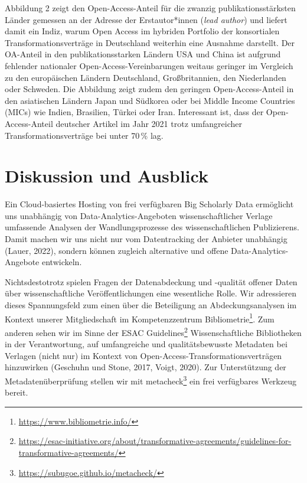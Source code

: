 \documentclass[a4paper,
fontsize=11pt,
oneside,
numbers=noperiodatend,
parskip=half-,
bibliography=totoc,
final
]{scrartcl}
\begin{document}
Abbildung 2 zeigt den Open-Access-Anteil für die zwanzig
publikationsstärksten Länder gemessen an der Adresse der Erstautor*innen
(\emph{lead author}) und liefert damit ein Indiz, warum Open Access im
hybriden Portfolio der konsortialen Transformationsverträge in
Deutschland weiterhin eine Ausnahme darstellt. Der OA-Anteil in den
publikationsstarken Ländern USA und China ist aufgrund fehlender
nationaler Open-Access-Vereinbarungen weitaus geringer im Vergleich zu
den europäischen Ländern Deutschland, Großbritannien, den Niederlanden
oder Schweden. Die Abbildung zeigt zudem den geringen Open-Access-Anteil
in den asiatischen Ländern Japan und Südkorea oder bei Middle Income
Countries (MICs) wie Indien, Brasilien, Türkei oder Iran. Interessant
ist, dass der Open-Access-Anteil deutscher Artikel im Jahr 2021 trotz
umfangreicher Transformationsverträge bei unter 70\,\% lag.

\hypertarget{diskussion-und-ausblick}{%
\section{Diskussion und Ausblick}\label{diskussion-und-ausblick}}

Ein Cloud-basiertes Hosting von frei verfügbaren Big Scholarly Data
ermöglicht uns unabhängig von Data-Analytics-Angeboten
wissenschaftlicher Verlage umfassende Analysen der Wandlungsprozesse des
wissenschaftlichen Publizierens. Damit machen wir uns nicht nur vom
Datentracking der Anbieter unabhängig (Lauer, 2022), sondern können
zugleich alternative und offene Data-Analytics-Angebote entwickeln.

Nichtsdestotrotz spielen Fragen der Datenabdeckung und -qualität offener
Daten über wissenschaftliche Veröffentlichungen eine wesentliche Rolle.
Wir adressieren dieses Spannungsfeld zum einen über die Beteiligung an
Abdeckungsanalysen im Kontext unserer Mitgliedschaft im Kompetenzzentrum
Bibliometrie\footnote{\url{https://www.bibliometrie.info/}}. Zum anderen
sehen wir im Sinne der ESAC Guidelines\footnote{\url{https://esac-initiative.org/about/transformative-agreements/guidelines-for-transformative-agreements/}}
Wissenschaftliche Bibliotheken in der Verantwortung, auf umfangreiche
und qualitätsbewusste Metadaten bei Verlagen (nicht nur) im Kontext von
Open-Access-Transformationsverträgen hinzuwirken (Geschuhn und Stone,
2017, Voigt, 2020). Zur Unterstützung der Metadatenüberprüfung stellen
wir mit metacheck\footnote{\url{https://subugoe.github.io/metacheck/}}
ein frei verfügbares Werkzeug bereit.
\end{document}
